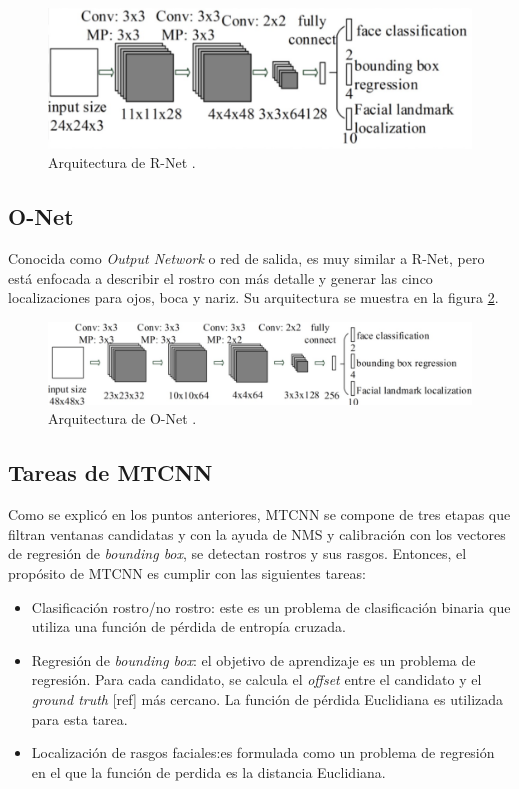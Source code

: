 \begin{figure}[h]
	\centering
	\includegraphics[scale=0.25]{./Figures/mtcnn_rnet.png}
	\caption{Arquitectura de R-Net \cite{mtcnn_info}.}
	\label{fig:mtcnn_rnet}
\end{figure}

\subsection{O-Net}
Conocida como \textit{Output Network} o red de salida, es muy similar a R-Net, pero está enfocada a describir el rostro con más detalle y generar las cinco localizaciones para ojos, boca y nariz. Su arquitectura se muestra en la figura \ref{fig:mtcnn_onet}.

\begin{figure}[h]
	\centering
	\includegraphics[scale=0.3]{./Figures/mtcnn_onet.png}
	\caption{Arquitectura de O-Net \cite{mtcnn_info}.}
	\label{fig:mtcnn_onet}
\end{figure}

\subsection{Tareas de MTCNN}
Como se explicó en los puntos anteriores, MTCNN se compone de tres etapas que filtran ventanas candidatas y con la ayuda de NMS y calibración con los vectores de regresión de \textit{bounding box}, se detectan rostros y sus rasgos. Entonces, el propósito de MTCNN es cumplir con las siguientes tareas:
\begin{itemize}
	\item Clasificación rostro/no rostro: este es un problema de clasificación binaria que utiliza una función de pérdida de entropía cruzada.
	\item Regresión de \textit{bounding box}: el objetivo de aprendizaje es un problema de regresión. Para cada candidato, se calcula el \textit{offset} entre el candidato y el \textit{ground truth} [ref] más cercano. La función de pérdida Euclidiana es utilizada para esta tarea.
	\item Localización de rasgos faciales:es formulada como un problema de regresión en el que la función de perdida es la distancia Euclidiana.
\end{itemize}

